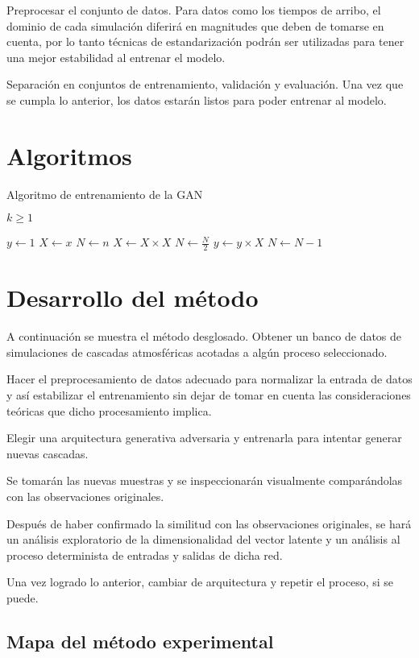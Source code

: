 Preprocesar el conjunto de datos.
Para datos como los tiempos de arribo, el dominio de cada simulación diferirá en magnitudes que deben de tomarse en cuenta, por lo tanto técnicas de estandarización podrán ser utilizadas para tener una mejor estabilidad al entrenar el modelo. 

Separación en conjuntos de entrenamiento, validación y evaluación. 
Una vez que se cumpla lo anterior, los datos estarán listos para poder entrenar al modelo.

\section{Algoritmos}

\begin{algorithm}
    \caption{Algoritmo de entrenamiento de la GAN}\label{alg:cap}
    \begin{algorithmic}
    \Require $k \geq 1$
        
    \EndFor
    \State $y \gets 1$
    \State $X \gets x$
    \State $N \gets n$
        \State $X \gets X \times X$
        \State $N \gets \frac{N}{2}$  
        \State $y \gets y \times X$
        \State $N \gets N - 1$
    \EndIf
    \EndWhile
    \end{algorithmic}
\end{algorithm}

\section{Desarrollo del método}

A continuación se muestra el método desglosado. 
Obtener un banco de datos de simulaciones de cascadas atmosféricas acotadas a algún proceso seleccionado.

Hacer el preprocesamiento de datos adecuado para normalizar la entrada de datos y así estabilizar el entrenamiento sin dejar de tomar en cuenta las consideraciones teóricas que dicho procesamiento implica.

Elegir una arquitectura generativa adversaria y entrenarla para intentar generar nuevas cascadas.

Se tomarán las nuevas muestras y se inspeccionarán visualmente comparándolas con las observaciones originales.

Después de haber confirmado la similitud con las observaciones originales, se hará un análisis exploratorio de la dimensionalidad del vector latente y un análisis al proceso determinista de entradas y salidas de dicha red. 

Una vez logrado lo anterior, cambiar de arquitectura y repetir el proceso, si se puede.

\subsection{Mapa del método experimental}